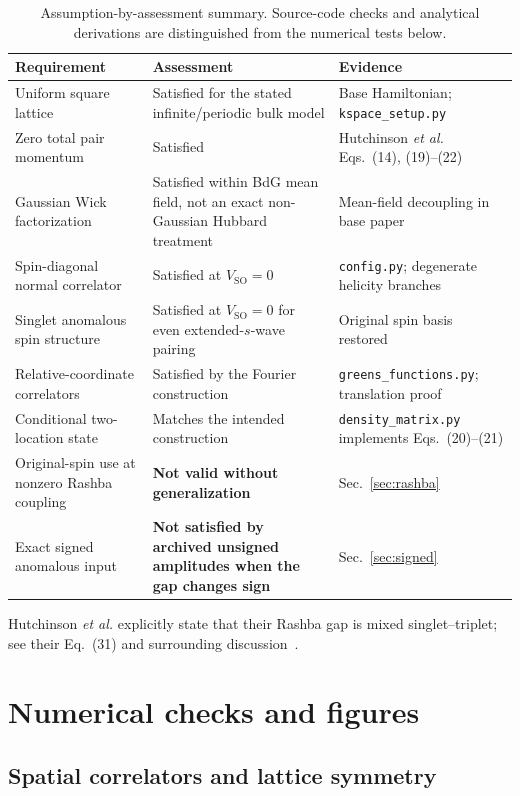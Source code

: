 \documentclass[11pt]{article}
\newcommand{\SO}{\mathrm{SO}}
\begin{document}
\begin{table}[H]
\centering
\small
\begin{tabularx}{\textwidth}{p{}p{}X}
\toprule
Requirement & Assessment & Evidence \\
\midrule
Uniform square lattice & Satisfied for the stated infinite/periodic bulk model & Base Hamiltonian; \texttt{kspace\_setup.py} \\
Zero total pair momentum & Satisfied & Hutchinson \emph{et al.} Eqs.~(14), (19)--(22) \\
Gaussian Wick factorization & Satisfied within BdG mean field, not an exact non-Gaussian Hubbard treatment & Mean-field decoupling in base paper \\
Spin-diagonal normal correlator & Satisfied at $V_{\SO}=0$ & \texttt{config.py}; degenerate helicity branches \\
Singlet anomalous spin structure & Satisfied at $V_{\SO}=0$ for even extended-$s$-wave pairing & Original spin basis restored \\
Relative-coordinate correlators & Satisfied by the Fourier construction & \texttt{greens\_functions.py}; translation proof \\
Conditional two-location state & Matches the intended construction & \texttt{density\_matrix.py} implements Eqs.~(20)--(21) \\
Original-spin use at nonzero Rashba coupling & \textbf{Not valid without generalization} & Sec.~\ref{sec:rashba} \\
Exact signed anomalous input & \textbf{Not satisfied by archived unsigned amplitudes when the gap changes sign} & Sec.~\ref{sec:signed} \\
\bottomrule
\end{tabularx}
\caption{Assumption-by-assessment summary. Source-code checks and analytical derivations are distinguished from the numerical tests below.}
\end{table}

Hutchinson \emph{et al.} explicitly state that their Rashba gap is mixed singlet--triplet; see their Eq.~(31) and surrounding discussion~\cite{Hutchinson}.

\section{Numerical checks and figures}

\subsection{Spatial correlators and lattice symmetry}
\end{document}
